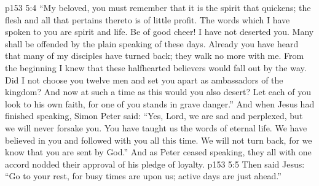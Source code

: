 \vs p153 5:4 \textcolor{ubdarkred}{“My beloved, you must remember that it is the spirit that quickens; the flesh and all that pertains thereto is of little profit. The words which I have spoken to you are spirit and life. Be of good cheer! I have not deserted you. Many shall be offended by the plain speaking of these days. Already you have heard that many of my disciples have turned back; they walk no more with me. From the beginning I knew that these halfhearted believers would fall out by the way. Did I not choose you twelve men and set you apart as ambassadors of the kingdom? And now at such a time as this would you also desert? Let each of you look to his own faith, for one of you stands in grave danger.”} And when Jesus had finished speaking, Simon Peter said: “Yes, Lord, we are sad and perplexed, but we will never forsake you. You have taught us the words of eternal life. We have believed in you and followed with you all this time. We will not turn back, for we know that you are sent by God.” And as Peter ceased speaking, they all with one accord nodded their approval of his pledge of loyalty.
\vs p153 5:5 Then said Jesus: \textcolor{ubdarkred}{“Go to your rest, for busy times are upon us; active days are just ahead.”}
